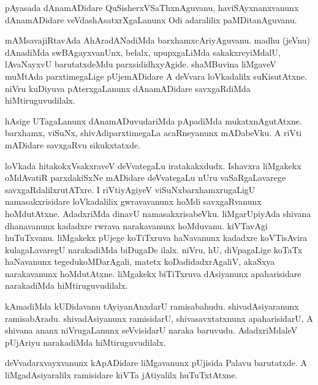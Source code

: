 \documentclass{article}
\begin{document}
\begin{mng}%
pAyasada dAnamADidare QuSisherxVSaThxnAguvanu, haviSAyxnanxvanunx 
dAnamADidare veVdashAsatxrXgaLanunx Odi adaralilix paMDitanAguvanu.
\end{mng}

\begin{mng}%
mAMsavajiRtavAda AhAradANadiMda barxhamxcAriyAguvanu. madhu (jeVnu) 
dAnadiMda swBAgayxvanUnx, belalx, upupxgaLiMda sakakxreyiMdalU, 
lAvaNayxvU barutatxdeMdu parxsididhxyAgide. shaMBuvina liMgaveV 
muMtAda parxtimegaLige pUjemADidare A deVvara loVkadalilx 
suKisutAtxne. niVru kuDiyuva pAterxgaLanunx dAnamADidare savxgaRdiMda 
hiMtiruguvudilalx.
\end{mng}

\begin{mng}%
hAsige UTagaLanunx dAnamADuvudariMda pApadiMda mukatxnAgutAtxne. 
barxhamx, viSuNx, shivAdiparxtimegaLa acaRneyanunx mADabeVku. A riVti 
mADidare savxgaRvu sikukxtatxde.
\end{mng}

\begin{mng}%
loVkada hitakokxVsakxraveV deVvategaLu iratakakxdudx. Ishavxra 
liMgakekx oMdAvatiR parxdakiSxNe mADidare deVvategaLu nUru 
vaSaRgaLavarege savxgaRdalilxrutATxre. I riVtiyAgiyeV 
viSuNxbarxhamxrugaLigU namasakxrisidare loVkadalilix gwravavanunx 
hoMdi savxgaRvanunx hoMdutAtxne. AdadxriMda dinavU namasakxrisabeVku. 
liMgarUpiyAda shivana dhanavanunx kadadxre rwrava narakavanunx 
hoMduvanu. kiVTavAgi huTuTxvanu. liMgakekx pUjege koTiTxruva 
haNavanunx kadadxre koVTisAvira kulagaLavaregU narakadiMda biDugaDe 
ilalx. niVru, hU, diVpagaLige koTaTx haNavanunx tegedukoMDarAgali, 
matetx koDadidadxrAgaliV, akaSxya narakavanunx hoMdutAtxne. liMgakekx 
biTiTxruva dAsiyanunx apaharisidare narakadiMda hiMtiruguvudilalx.
\end{mng}

\begin{mng}%
kAmadiMda kUDidavanu tAyiyanAnxdarU ramisabahudu. shivadAsiyaranunx 
ramisabAradu. shivadAsiyanunx ramisidarU, shivasavxtatxnunx 
apaharisidarU, A shivana ananx niVrugaLanunx seVvisidarU naraka 
baruvudu. AdadxriMdaleV pUjAriyu narakadiMda hiMtiruguvudilalx.
\end{mng}

\begin{mng}%
deVvadarxvayxvanunx kApADidare liMgavanunx pUjisida Palavu barutatxde. 
A liMgadAsiyaralilx ramisidare kiVTa jAtiyalilx huTuTxtAtxne.
\end{mng}
\end{document}
